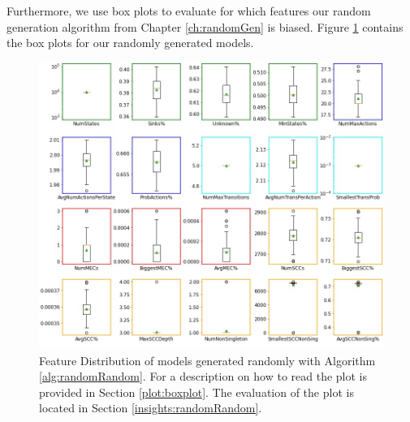 Furthermore, we use box plots to evaluate for which features our random generation algorithm from Chapter \ref{ch:randomGen} is biased.
Figure \ref{fig:Random_FeatureDistribution} contains the box plots for our randomly generated models.
\begin{figure}[h!]
    \centering
    \includegraphics[width=1\textwidth]{figures/RandomRandom_FeatureDistribution.jpg}
    \caption[Feature Distribution of random models]{
        Feature Distribution of models generated randomly with Algorithm \ref{alg:randomRandom}. For a description on how to read the plot is provided in Section \ref{plot:boxplot}.
        The evaluation of the plot is located in Section \ref{insights:randomRandom}.
    }
    \label{fig:Random_FeatureDistribution}
\end{figure}
\FloatBarrier

